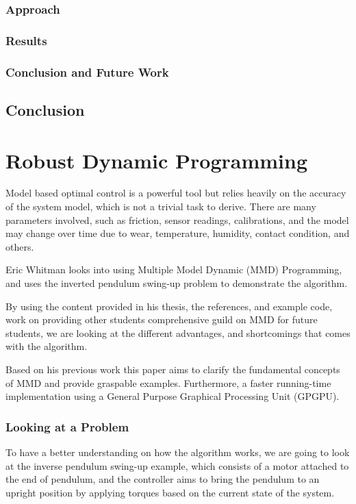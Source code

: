 \documentclass[12pt]{report}
\begin{document}
\subsection{Approach}
\subsection{Results}
\subsection{Conclusion and Future Work}

\section{Conclusion}

\chapter{Robust Dynamic Programming}
Model based optimal control is a powerful tool but relies heavily on the accuracy of the system model, which is not a trivial task to derive. There are many parameters involved, such as friction, sensor readings, calibrations, and the model may change over time due to wear, temperature, humidity, contact condition, and others.

Eric Whitman looks into using Multiple Model Dynamic (MMD) Programming, and uses the inverted pendulum swing-up problem to demonstrate the algorithm. \cite{eric_thesis}
 
By using the content provided in his thesis, the references, and example code, work on providing other students comprehensive guild on MMD for future students, we are looking at the different advantages, and shortcomings that comes with the algorithm.

Based on his previous work this paper aims to clarify the fundamental concepts of MMD and provide graspable examples. Furthermore, a faster running-time implementation using a General Purpose Graphical Processing Unit (GPGPU).

\subsection{Looking at a Problem}
To have a better understanding on how the algorithm works, we are going to look at the  inverse pendulum swing-up example, which consists of a motor attached to the end of pendulum, and the controller aims to bring the pendulum to an upright position by applying torques based on the current state of the system. 
\end{document}
